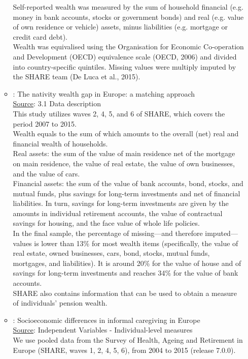 \documentclass[12pt]{article}
\begin{document}
\begin{itemize}
\begin{itemize}
        Self-reported wealth was measured by the sum of household financial (e.g. money in bank accounts, stocks or government bonds) and real (e.g. value of own residence or vehicle) assets, minus liabilities (e.g. mortgage or credit card debt). \\
        Wealth was equivalised using the Organisation for Economic Co-operation and Development (OECD) equivalence scale (OECD, 2006) and divided into country-specific quintiles. Missing values were multiply imputed by the SHARE team (De Luca et al., 2015).
        \item \cite{ferrari2020nativity}: The nativity wealth gap in Europe: a matching approach \\
        \uline{Source}: 3.1 Data description \\
        This study utilizes waves 2, 4, 5, and 6 of SHARE, which covers the period 2007 to 2015. \\
        Wealth equals to the sum of which amounts to the overall (net) real and financial wealth of households. \\
        Real assets: the sum of the value of main residence net of the mortgage on main residence, the value of real estate, the value of own businesses, and the value of cars. \\
        Financial assets: the sum of the value of bank accounts, bond, stocks, and mutual funds, plus savings for long-term investments and net of financial liabilities. In turn, savings for long-term investments are given by the amounts in individual retirement accounts, the value of contractual savings for housing, and the face value of whole life policies. \\
        In the final sample, the percentage of missing—and therefore imputed—values is lower than 13\% for most wealth items (specifically, the value of real estate, owned businesses, cars, bond, stocks, mutual funds, mortgages, and liabilities). It is around 20\% for the value of house and of savings for long-term investments and reaches 34\% for the value of bank accounts. \\
        SHARE also contains information that can be used to obtain a measure of individuals’ pension wealth.
        \item \cite{quashie2022socioeconomic}: Socioeconomic differences in informal caregiving in Europe \\
        \uline{Source}: Independent Variables - Individual-level measures \\
        We use pooled data from the Survey of Health, Ageing and Retirement in Europe (SHARE, waves 1, 2, 4, 5, 6), from 2004 to 2015 (release 7.0.0). \\

\end{itemize}
\end{itemize}
\end{document}
